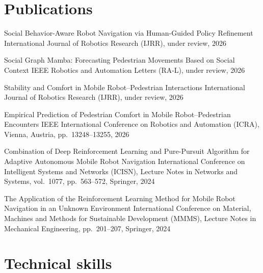 \documentclass[10pt]{article}
\begin{document}
\section{Publications}

    {Social Behavior-Aware Robot Navigation via Human-Guided Policy Refinement}
    {International Journal of Robotics Research (IJRR), under review, 2026}
    {}

    {Social Graph Mamba: Forecasting Pedestrian Movements Based on Social Context}
    {IEEE Robotics and Automation Letters (RA-L), under review, 2026}
    {}

    {Stability and Comfort in Mobile Robot--Pedestrian Interactions}
    {International Journal of Robotics Research (IJRR), under review, 2026}
    {}

    {Empirical Prediction of Pedestrian Comfort in Mobile Robot--Pedestrian Encounters}
    {IEEE International Conference on Robotics and Automation (ICRA), Vienna, Austria, pp.~13248--13255, 2026}
    {}

    {Combination of Deep Reinforcement Learning and Pure-Pursuit Algorithm for Adaptive Autonomous Mobile Robot Navigation}
    {International Conference on Intelligent Systems and Networks (ICISN), Lecture Notes in Networks and Systems, vol.~1077, pp.~563--572, Springer, 2024}
    {}

    {The Application of the Reinforcement Learning Method for Mobile Robot Navigation in an Unknown Environment}
    {International Conference on Material, Machines and Methods for Sustainable Development (MMMS), Lecture Notes in Mechanical Engineering, pp.~201--207, Springer, 2024}
    {}


\section{Technical skills}

\end{document}
